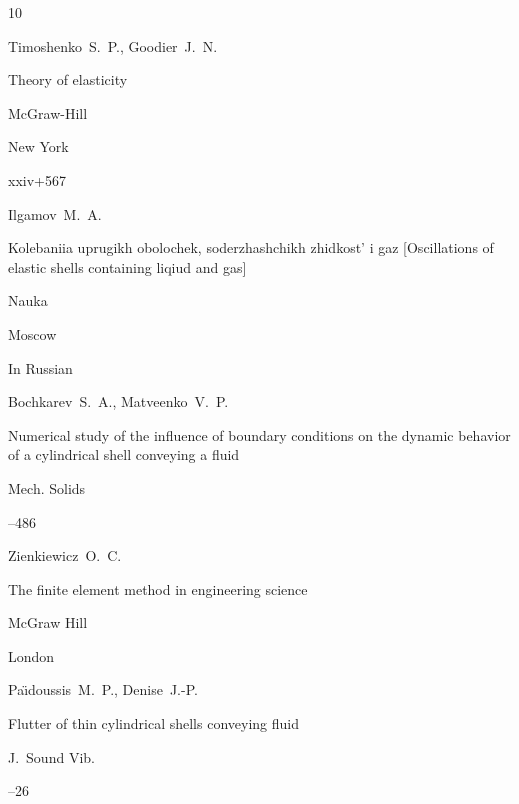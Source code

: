 \begin{thebibliography}{10}

\by Timoshenko~S.~P., Goodier~J.~N.

\book Theory of elasticity


\publ McGraw-Hill

\publaddr New York

\totalpages xxiv+567




\by Ilgamov~M.~A.

\book Kolebaniia uprugikh obolochek, soderzhashchikh zhidkost' i gaz \rm [Oscillations of elastic shells containing liqiud and gas]


\publ Nauka

\publaddr Moscow

\lang In Russian





\by Bochkarev~S.~A., Matveenko~V.~P.

\paper Numerical study of the influence of boundary conditions on the dynamic behavior of a cylindrical shell conveying a fluid

\jour Mech. Solids




–486






\by Zienkiewicz~O.~C.

\book The finite element method in engineering science


\publ McGraw Hill

\publaddr London





\by Pa\"{\i}doussis~M.~P., Denise~J.-P.

\paper Flutter of thin cylindrical shells conveying fluid

\jour J.~Sound Vib.



--26




\end{thebibliography}









%

